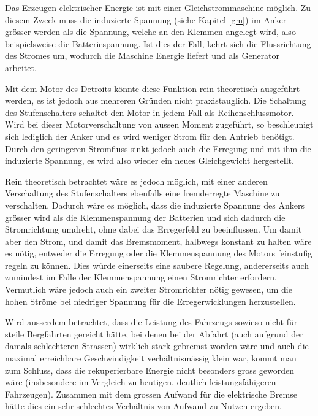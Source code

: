 Das Erzeugen elektrischer Energie ist mit einer Gleichstrommaschine möglich. Zu diesem Zweck muss die induzierte Spannung (siehe Kapitel \ref{gm}) im Anker grösser werden als die Spannung, welche an den Klemmen angelegt wird, also beispielsweise die Batteriespannung. Ist dies der Fall, kehrt sich die Flussrichtung des Stromes um, wodurch die Maschine Energie liefert und als Generator arbeitet.

Mit dem Motor des Detroits könnte diese Funktion rein theoretisch ausgeführt werden, es ist jedoch aus mehreren Gründen nicht praxistauglich. Die Schaltung des Stufenschalters schaltet den Motor in jedem Fall als Reihenschlussmotor. Wird bei dieser Motorverschaltung von aussen Moment zugeführt, so beschleunigt sich lediglich der Anker und es wird weniger Strom für den Antrieb benötigt. Durch den geringeren Stromfluss sinkt jedoch auch die Erregung und mit ihm die induzierte Spannung, es wird also wieder ein neues Gleichgewicht hergestellt.

Rein theoretisch betrachtet wäre es jedoch möglich, mit einer anderen Verschaltung des Stufenschalters ebenfalls eine fremderregte Maschine zu verschalten. Dadurch wäre es möglich, dass die induzierte Spannung des Ankers grösser wird als die Klemmenspannung der Batterien und sich dadurch die Stromrichtung umdreht, ohne dabei das Erregerfeld zu beeinflussen. Um damit aber den Strom, und damit das Bremsmoment, halbwegs konstant zu halten wäre es nötig, entweder die Erregung oder die Klemmenspannung des Motors feinstufig regeln zu können. Dies würde einerseits eine saubere Regelung, andererseits auch zumindest im Falle der Klemmenspannung einen Stromrichter erfordern. Vermutlich wäre jedoch auch ein zweiter Stromrichter nötig gewesen, um die hohen Ströme bei niedriger Spannung für die Erregerwicklungen herzustellen.

Wird ausserdem betrachtet, dass die Leistung des Fahrzeugs sowieso nicht für steile Bergfahrten gereicht hätte, bei denen bei der Abfahrt (auch aufgrund der damals schlechteren Strassen) wirklich stark gebremst worden wäre und auch die maximal erreichbare Geschwindigkeit verhältnismässig klein war, kommt man zum Schluss, dass die rekuperierbare Energie nicht besonders gross geworden wäre (insbesondere im Vergleich zu heutigen, deutlich leistungsfähigeren Fahrzeugen). Zusammen mit dem grossen Aufwand für die elektrische Bremse hätte dies ein sehr schlechtes Verhältnis von Aufwand zu Nutzen ergeben.